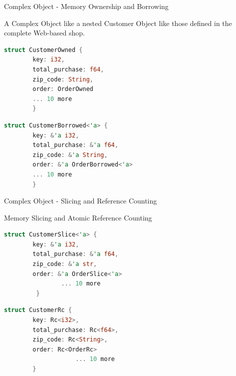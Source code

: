 \documentclass[9pt]{beamer}
\begin{document}

\begin{frame}[fragile]{Complex Object - Memory Ownership and Borrowing}

A Complex Object like a nested Customer Object like those defined in the complete Web-based shop. 
 
\centering
\begin{minipage}{0.8\linewidth}
\begin{lstlisting}[title={Memory Ownership},language=Rust] 
struct CustomerOwned {
		key: i32,
		total_purchase: f64,
		zip_code: String,
		order: OrderOwned
		... 10 more 
        }
\end{lstlisting}
\end{minipage}    
 

\begin{minipage}{0.8\linewidth}
\begin{lstlisting}[title={Memory Borrowing},language=Rust] 
struct CustomerBorrowed<'a> {
		key: &'a i32,
		total_purchase: &'a f64,
		zip_code: &'a String,
		order: &'a OrderBorrowed<'a>
		... 10 more 
        }
\end{lstlisting}
\end{minipage}    
    
\end{frame}





\begin{frame}[t,fragile]{Complex Object - Slicing and Reference Counting }

Memory Slicing and Atomic Reference Counting 
   
\centering
    
\begin{minipage}{0.8\linewidth}
\begin{lstlisting}[title={Memory Slicing},language=Rust] 
struct CustomerSlice<'a> {
		key: &'a i32,
		total_purchase: &'a f64,
		zip_code: &'a str,
		order: &'a OrderSlice<'a>
        		... 10 more 
         }
\end{lstlisting}
\end{minipage}    


\begin{minipage}{0.8\linewidth}
\begin{lstlisting}[title={Atomic Reference Counting },language=Rust] 
struct CustomerRc {
		key: Rc<i32>,
		total_purchase: Rc<f64>,
		zip_code: Rc<String>,
		order: Rc<OrderRc>
		      		... 10 more 
        }
\end{lstlisting}
\end{minipage}   

\end{frame}
\end{document}
